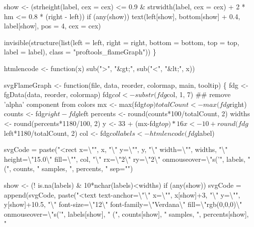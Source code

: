 \documentclass[11pt]{article}
\begin{document}
\begin{nwchunk}
     show <- (strheight(label, cex = cex) <= 0.9 &
              strwidth(label, cex = cex) + 2 * hm <= 0.8 * (right - left))
     if (any(show))
         text(left[show], bottom[show] + 0.4, label[show], pos = 4, cex = cex)
 
     invisible(structure(list(left = left, right = right,
                              bottom = bottom, top = top,
                              label = label),
                         class = "proftools_flameGraph"))
 \}
 
 htmlencode <- function(x)
     sub(">", "&gt;", sub("<", "&lt;", x))
 
 svgFlameGraph <- function(file, data, reorder, colormap, main,
                           tooltip) \{
     fdg <- fgData(data, reorder, colormap)
     fdg$col <- substr(fdg$col, 1, 7) ## remove 'alpha' component from colors
     mx <- max(fdg$top)
     totalCount <- max(fdg$right)
     counts <- fdg$right-fdg$left
     percents <- round(counts*100/totalCount, 2)
     widths <- round(percents*1180/100, 2)
     y <- 33 + (mx-fdg$top)*16
     x <- 10+round(fdg$left*1180/totalCount, 2)
     col <- fdg$col
     labels <- htmlencode(fdg$label)
     
     svgCode = paste("<rect x={\textbackslash}"", x, "{\textbackslash}" y={\textbackslash}"", y, 
     "{\textbackslash}" width={\textbackslash}"", widths, "{\textbackslash}" height={\textbackslash}"15.0{\textbackslash}" fill={\textbackslash}"", col, 
     "{\textbackslash}" rx={\textbackslash}"2{\textbackslash}" ry={\textbackslash}"2{\textbackslash}" onmouseover={\textbackslash}"s('", labels, " (",
     counts, " samples, ", percents, "%
     sep="")
 
     show <- (! is.na(labels) & 10*nchar(labels)<widths)
     if (any(show))
         svgCode = append(svgCode, paste("<text text-anchor={\textbackslash}"{\textbackslash}" x={\textbackslash}"", 
         x[show]+3, "{\textbackslash}" y={\textbackslash}"", y[show]+10.5, "{\textbackslash}" font-size={\textbackslash}"12{\textbackslash}" font-family={\textbackslash}"Verdana{\textbackslash}" fill={\textbackslash}"rgb(0,0,0){\textbackslash}" onmouseover={\textbackslash}"s('", 
         labels[show], " (", counts[show], " samples, ", percents[show], 
         "%
         

\end{nwchunk}
\end{document}
